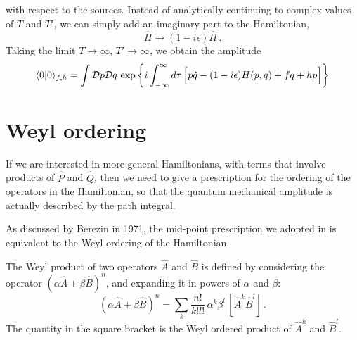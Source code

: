with respect to the sources. Instead of analytically continuing to
complex values of $T$ and $T'$, we can simply add an imaginary part to
the Hamiltonian,
\begin{equation}
  \label{eq:ComplexTermHam}
  \hat{H} \to (1-i\epsilon) \hat{H}\, .
\end{equation}
Taking the limit $T\to\infty$, $T'\to\infty$, we obtain the amplitude
\begin{equation}
  \label{eq:VacToVac}
  \langle 0 | 0 \rangle_{f,h} = \int \mathcal{D}p \mathcal{D}q \, \exp
  \left\{
    i \int_{-\infty}^\infty d\tau\, \Big[
      p \dot{q} - (1-i\epsilon) H(p,q) + f q + h p 
      \Big]
  \right\}
\end{equation}


\section{Weyl ordering}
\label{sec:weyl-ordering}

If we are interested in more general Hamiltonians, with terms that
involve products of $\hat{P}$ and $\hat{Q}$, then we need to give a
prescription for the ordering of the operators in the Hamiltonian, so
that the quantum mechanical amplitude is actually described by the
path integral. 

As discussed by Berezin in 1971, the mid-point prescription we adopted
in  is equivalent to the Weyl-ordering of the
Hamiltonian. 

The Weyl product of two operators $\hat{A}$ and $\hat{B}$ is defined
by considering the operator $\left(\alpha \hat{A} + \beta
  \hat{B}\right)^n$, and expanding it in powers of $\alpha$ and $\beta$: 
\begin{equation}
  \label{eq:WeylOrder}
  \left(\alpha \hat{A} + \beta
    \hat{B}\right)^n = \sum_k \frac{n!}{k! l!}\, 
  \alpha^k \beta^l\, \left[\hat{A}^k
    \hat{B}^l\right]\, .
\end{equation}
The quantity in the square bracket is the Weyl ordered product of
$\hat{A}^k$ and $\hat{B}^l$. 

